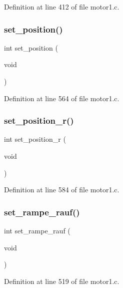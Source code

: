 Definition at line 412 of file motor1.\+c.

\mbox{\label{motor1_8c_a843057b82662549bcf7103b65041af8a}} 
\subsubsection{set\+\_\+position()}
{\footnotesize\ttfamily int set\+\_\+position (\begin{DoxyParamCaption}\item[{void}]{ }\end{DoxyParamCaption})}



Definition at line 564 of file motor1.\+c.

\mbox{\label{motor1_8c_a233b311a59e81e28d3715ee8747ccc16}} 
\subsubsection{set\+\_\+position\+\_\+r()}
{\footnotesize\ttfamily int set\+\_\+position\+\_\+r (\begin{DoxyParamCaption}\item[{void}]{ }\end{DoxyParamCaption})}



Definition at line 584 of file motor1.\+c.

\mbox{\label{motor1_8c_a6eb5854d93e82cf44070cf68ac925d54}} 
\subsubsection{set\+\_\+rampe\+\_\+rauf()}
{\footnotesize\ttfamily int set\+\_\+rampe\+\_\+rauf (\begin{DoxyParamCaption}\item[{void}]{ }\end{DoxyParamCaption})}



Definition at line 519 of file motor1.\+c.

\mbox{\label{motor1_8c_a288a1d04e8500a9330b66dd38faf2fef}} 
